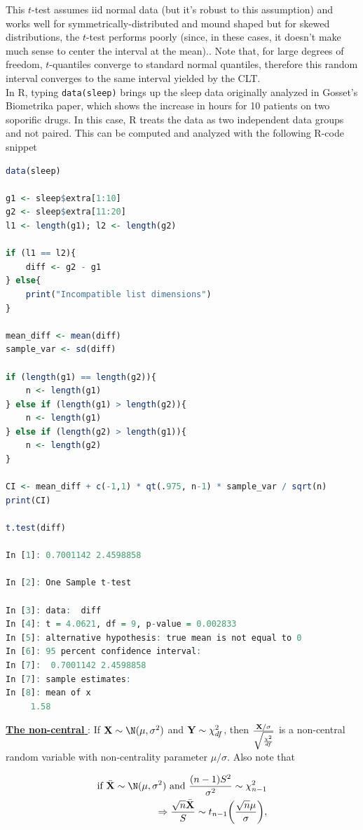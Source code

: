 \documentclass{homework}
\begin{document}
This $t$-test assumes iid normal data (but it's robust to this assumption) and works well for symmetrically-distributed and mound shaped but for skewed distributions, the $t$-test performs poorly (since, in these cases, it doesn't make much sense to center the interval at the mean).. Note that, for large degrees of freedom, $t$-quantiles converge to standard normal quantiles, therefore this random interval 
converges to the same interval yielded by the CLT.  \\

In R, typing \texttt{data(sleep)} brings up the sleep data originally analyzed in Gosset's Biometrika paper, which shows the increase in hours for 10 patients on two soporific drugs. In this case, R treats the data as two independent data groups and not paired. This can be computed and analyzed with the following R-code snippet 

\begin{lstlisting}[language=R]
data(sleep)

g1 <- sleep$extra[1:10]
g2 <- sleep$extra[11:20]
l1 <- length(g1); l2 <- length(g2)

if (l1 == l2){
    diff <- g2 - g1
} else{
    print("Incompatible list dimensions")
} 

mean_diff <- mean(diff)
sample_var <- sd(diff) 

if (length(g1) == length(g2)){
    n <- length(g1)
} else if (length(g1) > length(g2)){
    n <- length(g1)    
} else if (length(g2) > length(g1)){
    n <- length(g2)
}

CI <- mean_diff + c(-1,1) * qt(.975, n-1) * sample_var / sqrt(n)
print(CI)

t.test(diff) 

In [1]: 0.7001142 2.4598858

In [2]:	One Sample t-test

In [3]: data:  diff
In [4]: t = 4.0621, df = 9, p-value = 0.002833
In [5]: alternative hypothesis: true mean is not equal to 0
In [6]: 95 percent confidence interval:
In [7]:  0.7001142 2.4598858
In [7]: sample estimates:
In [8]: mean of x 
     1.58 
\end{lstlisting}

\underline{\textbf{The non-central \tdis}}: If $\X \sim \N(\mu, \sigma^2)$ and ${\bf Y} \sim \chi^2_{df}$, then 
$\frac{{\bf X}/\sigma}{\sqrt{\frac{\chi^2}{df}}}$ is a non-central \tdis random variable with non-centrality parameter $\mu/\sigma$. Also note that 

\begin{align*}
    \textnormal{if } \bar{\X} \sim \N(\mu, \sigma^2) \textnormal{ and } \frac{(n-1)S^2}{\sigma^2} \sim \chi_{n-1}^2 \\
    \Rightarrow \frac{\sqrt{n}\bar{\X}}{S} \sim t_{n-1}\bigg(\frac{\sqrt{n}\mu}{\sigma}\bigg),
\end{align*}
\end{document}
